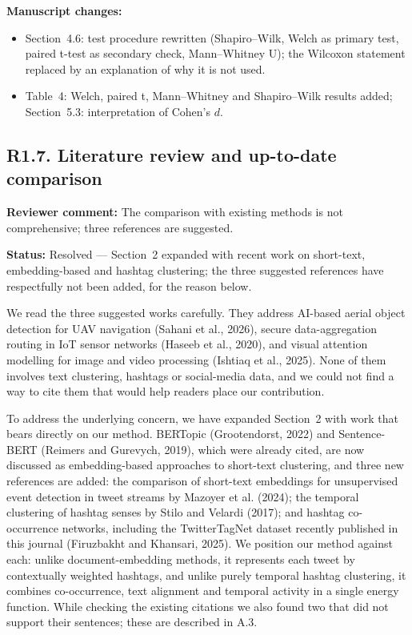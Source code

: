 \documentclass[11pt,a4paper]{article}
\newcommand{\status}[1]{\textbf{\color{statusgreen}Status:} #1}
\newcommand{\parthead}[1]{\par\medskip\textbf{#1}\par}
\begin{document}
\parthead{Manuscript changes:}
\begin{itemize}
\item Section~4.6: test procedure rewritten (Shapiro--Wilk, Welch as primary test, paired t-test as secondary check, Mann--Whitney U); the Wilcoxon statement replaced by an explanation of why it is not used.
\item Table~4: Welch, paired t, Mann--Whitney and Shapiro--Wilk results added; Section~5.3: interpretation of Cohen's $d$.
\end{itemize}

\subsection{R1.7. Literature review and up-to-date comparison}

\begin{revcomment}
\textbf{Reviewer comment:} The comparison with existing methods is not comprehensive; three references are suggested.
\end{revcomment}

\status{Resolved --- Section~2 expanded with recent work on short-text, embedding-based and hashtag clustering; the three suggested references have respectfully not been added, for the reason below.}

We read the three suggested works carefully. They address AI-based aerial object detection for UAV navigation (Sahani et al., 2026), secure data-aggregation routing in IoT sensor networks (Haseeb et al., 2020), and visual attention modelling for image and video processing (Ishtiaq et al., 2025). None of them involves text clustering, hashtags or social-media data, and we could not find a way to cite them that would help readers place our contribution.

To address the underlying concern, we have expanded Section~2 with work that bears directly on our method. BERTopic (Grootendorst, 2022) and Sentence-BERT (Reimers and Gurevych, 2019), which were already cited, are now discussed as embedding-based approaches to short-text clustering, and three new references are added: the comparison of short-text embeddings for unsupervised event detection in tweet streams by Mazoyer et al. (2024); the temporal clustering of hashtag senses by Stilo and Velardi (2017); and hashtag co-occurrence networks, including the TwitterTagNet dataset recently published in this journal (Firuzbakht and Khansari, 2025). We position our method against each: unlike document-embedding methods, it represents each tweet by contextually weighted hashtags, and unlike purely temporal hashtag clustering, it combines co-occurrence, text alignment and temporal activity in a single energy function. While checking the existing citations we also found two that did not support their sentences; these are described in A.3.
\end{document}
